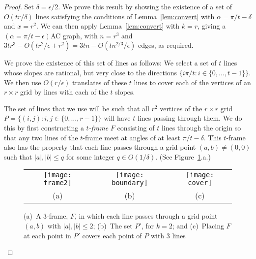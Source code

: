 \documentclass{patmorin}
\newcommand{\figlabel}[1]{\label{fig:#1}}
\newcommand{\figref}[1]{\mbox{Figure~\ref{fig:#1}}}
\newcommand{\lemref}[1]{Lemma~\ref{lem:#1}}
\begin{document}
\begin{proof}
Set $\delta=\epsilon/2$.  We prove this result by showing the
existence of a set of $O(tr/\delta)$ lines satisfying the conditions of
\lemref{convert} with $\alpha=\pi/t-\delta$ and $x=r^2$.  We can then
apply \lemref{convert} with $k=r$, giving a $(\alpha = \pi/t-\epsilon)$AC
graph, with $n=r^3$ and $3tr^3 - O(tr^2/\epsilon + r^2) = 3tn -
O(tn^{2/3}/\epsilon)$ edges, as required.

We prove the existence of this set of lines as follows: We select a set
of $t$ lines whose slopes are rational, but very close to the directions
$\{i\pi/t:i\in\{0,\ldots,t-1\}\}$.  We then use $O(r/\epsilon)$
translates of these $t$ lines to cover each of the vertices of an $r\times
r$ grid by lines with each of the $t$ slopes.

The set of lines that we use will be such that all $r^2$ vertices of
the $r\times r$ grid $P=\{(i,j): i,j\in\{0,\ldots,r-1\}\}$ will have
$t$ lines passing through them.  We do this by first constructing a
\emph{$t$-frame} $F$ consisting of $t$ lines through the origin so that
any two lines of the $t$-frame meet at angles of at least $\pi/t-\delta$.
This $t$-frame also has the property that each line passes through a
grid point $(a,b)\neq(0,0)$ such that $|a|,|b|\le q$ for some integer $q\in
O(1/\delta)$. (See \figref{bigproof}.a.)

\begin{figure}
  \begin{center}
    \begin{tabular}{ccc}
    \texttt{[image: frame2]}
    &
    \texttt{[image: boundary]}
    &
    \texttt{[image: cover]} \\
    (a) & (b) & (c)
    \end{tabular}
  \end{center}
  \caption{(a)~A 3-frame, $F$, in which each line passes through a grid point
$(a,b)$ with $|a|,|b| \le 2$; 
           (b)~The set $P'$, for $k=2$; and 
           (c)~Placing $F$ at each point in $P'$ covers each point of
$P$ with 3 lines}
  \figlabel{bigproof}
\end{figure}

\newcommand{\floor}[1]{\lfloor #1 \rfloor}


\end{proof}
\end{document}
